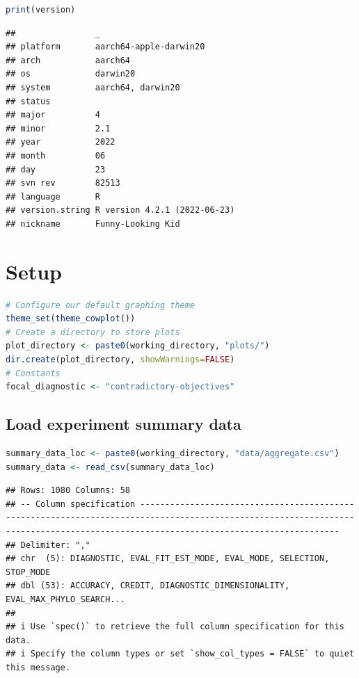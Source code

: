 \documentclass[
]{book}
\begin{document}
\begin{lstlisting}[language=R]
print(version)
\end{lstlisting}

\begin{lstlisting}
##                _                           
## platform       aarch64-apple-darwin20      
## arch           aarch64                     
## os             darwin20                    
## system         aarch64, darwin20           
## status                                     
## major          4                           
## minor          2.1                         
## year           2022                        
## month          06                          
## day            23                          
## svn rev        82513                       
## language       R                           
## version.string R version 4.2.1 (2022-06-23)
## nickname       Funny-Looking Kid
\end{lstlisting}

\hypertarget{setup-1}{%
\section{Setup}\label{setup-1}}

\begin{lstlisting}[language=R]
# Configure our default graphing theme
theme_set(theme_cowplot())
# Create a directory to store plots
plot_directory <- paste0(working_directory, "plots/")
dir.create(plot_directory, showWarnings=FALSE)
# Constants
focal_diagnostic <- "contradictory-objectives"
\end{lstlisting}

\hypertarget{load-experiment-summary-data-1}{%
\subsection{Load experiment summary data}\label{load-experiment-summary-data-1}}

\begin{lstlisting}[language=R]
summary_data_loc <- paste0(working_directory, "data/aggregate.csv")
summary_data <- read_csv(summary_data_loc)
\end{lstlisting}

\begin{lstlisting}
## Rows: 1080 Columns: 58
## -- Column specification ------------------------------------------------------------------------------------------------------------------------------------------------------------------------------------
## Delimiter: ","
## chr  (5): DIAGNOSTIC, EVAL_FIT_EST_MODE, EVAL_MODE, SELECTION, STOP_MODE
## dbl (53): ACCURACY, CREDIT, DIAGNOSTIC_DIMENSIONALITY, EVAL_MAX_PHYLO_SEARCH...
## 
## i Use `spec()` to retrieve the full column specification for this data.
## i Specify the column types or set `show_col_types = FALSE` to quiet this message.
\end{lstlisting}
\end{document}
